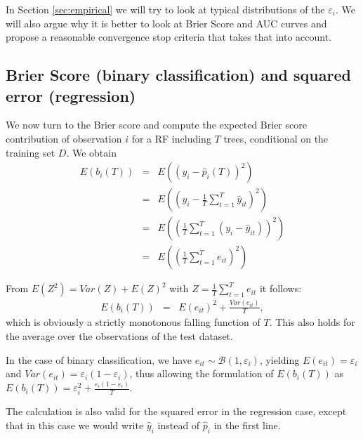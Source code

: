 \documentclass[paper=a4
               ,12pt
               ,DIV=12
               ,parskip=half
               ,titlepage=on
               ,headinclude 
               ,footinclude
               ,headsepline
               ,footsepline         %
               ,ilines 
               ]{scrartcl}
\begin{document}
In Section \ref{sec:empirical} we will try to look at typical distributions of the $\varepsilon_i$. We will also argue why it is better to look at Brier Score and AUC curves 
and propose a reasonable convergence stop criteria that takes that into account.


\subsection{Brier Score (binary classification) and squared error (regression)}
We now turn to the Brier score and compute the expected Brier score contribution of observation $i$ for a RF including $T$ trees, conditional on the training set $D$. We obtain
\begin{eqnarray*}
 E(b_i(T)) & = & E((y_i - \hat{p}_i(T) ) ^2) \\
                    & = & E \left( \left( y_i-\frac{1}{T}\sum_{t=1}^T\hat{y}_{it} \right)^2 \right) \\
                    & = & E \left( \left( \frac{1}{T}\sum_{t=1}^T(y_i-\hat{y}_{it}) \right)^2 \right) \\
                    & = & E \left( \left( \frac{1}{T}\sum_{t=1}^T e_{it} \right)^2 \right)
\end{eqnarray*} 


From $E(Z^2) = Var(Z)+E(Z)^2$ with $Z=\frac{1}{T}\sum_{t=1}^T e_{it}$  it follows:
\begin{eqnarray*}
 E(b_i(T)) & = & E(e_{it})^2+\frac{Var(e_{it})}{T},
\end{eqnarray*} 
which is obviously a strictly monotonous falling function of $T$. This also holds for the average over the observations of the test dataset. 

In the case of binary classification, we have  $e_{it}\sim\mathcal{B}(1,\varepsilon_i)$, yielding $E(e_{it})=\varepsilon_i$ and $Var(e_{it})=\varepsilon_i(1-\varepsilon_i)$, thus allowing the formulation of  $E(b_i(T))$ as $E(b_i(T))=\varepsilon_i^2+\frac{\varepsilon_i(1-\varepsilon_i)}{T}$.

The calculation is also valid for the squared error in the regression case, except that in this case we would write $\hat{y}_{i}$ instead of $\hat{p}_{i}$ in the first line. 
\end{document}

